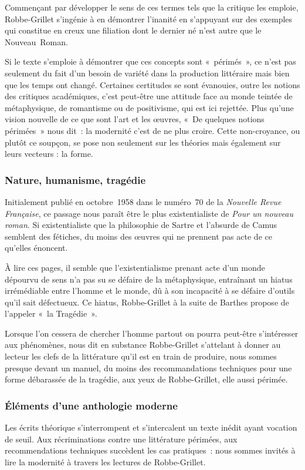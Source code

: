 \documentclass[12pt, a4paper]{article}
\begin{document}
Commençant par développer le sens de ces termes tels que la critique les emploie, Robbe-Grillet s'ingénie à en démontrer l'inanité en s'appuyant sur des exemples qui constitue en creux une filiation dont le dernier né n'est autre que le Nouveau~Roman.

Si le texte s'emploie à démontrer que ces concepts sont «~périmés~», ce n'est pas seulement du fait d'un besoin de variété dans la production littéraire mais bien que les temps ont changé. Certaines certitudes se sont évanouies, outre les notions des critiques académiques, c'est peut-être une attitude face au monde teintée de métaphysique, de romantisme ou de positivisme, qui est ici rejettée. Plus qu'une vision nouvelle de ce que sont l'art et les œuvres, «~De quelques notions périmées~» nous dit~: la modernité c'est de ne plus croire. Cette non-croyance, ou plutôt ce soupçon, se pose non seulement sur les théories mais également sur leurs vecteurs : la forme.


\subsubsection{Nature, humanisme, tragédie}
			Initialement publié en octobre~1958 dans le numéro~70 de la \textit{Nouvelle Revue Française}, ce passage nous paraît être le plus existentialiste de \textit{Pour un nouveau roman}. Si existentialiste que la philosophie de Sartre et l'absurde de Camus semblent des fétiches, du moins des œuvres qui ne prennent pas acte de ce qu'elles énoncent.

À lire ces pages, il semble que l'existentialisme prenant acte d'un monde dépourvu de sens n'a pas su se défaire de la métaphysique, entraînant un hiatus irrémédiable entre l'homme et le monde, dû à son incapacité à se défaire d'outils qu'il sait défectueux. Ce hiatus, Robbe-Grillet à la suite de Barthes propose de l'appeler «~la Tragédie~».

Lorsque l'on cessera de chercher l'homme partout on pourra peut-être s'intéresser aux phénomènes, nous dit en substance Robbe-Grillet s'attelant à donner au lecteur les clefs de la littérature qu'il est en train de produire, nous sommes presque devant un manuel, du moins des recommandations techniques pour une forme débarassée de la tragédie, aux yeux de Robbe-Grillet, elle aussi périmée.

				\subsubsection{Éléments d'une anthologie moderne}
			Les écrits théorique s'interrompent et s'intercalent un texte inédit ayant vocation de seuil. Aux récriminations contre une littérature périmées, aux recommendations techniques succèdent les cas pratiques~: nous sommes invités à lire la modernité à travers les lectures de Robbe-Grillet.
\end{document}
